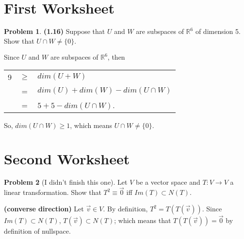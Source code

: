 \documentclass[11pt]{article}
\makeatletter
\renewenvironment{proof}{{\bfseries Proof}}{\qed}
\renewenvironment{proof}[1][\bfseries \proofname]{\par
  \pushQED{\qed}%
  \normalfont \topsep6\p@\@plus6\p@\relax
  \trivlist
  \item[\hskip\labelsep
        \scshape
    #1\@addpunct{}]\ignorespaces
}{%
  \popQED\endtrivlist\@endpefalse
}
\theoremstyle{definition}%
\newtheorem{problem}{Problem}[section]
\newcommand{\R}{\mathbb{R}}
\makeatother
\begin{document}
\section{First Worksheet}

\begin{problem}\textbf{(1.16)}
Suppose that $U$ and $W$ are subspaces of $\R^6$ of dimension 5. Show that $U \cap W \neq \{0\}.$

\begin{proof}
Since $U$ and $W$ are subspaces of $\R^6$, then 

\begin{tabular}{rcl}
9 	&$\geq$ 	& $dim(U + W)$ \\
	& =			& $dim(U) + dim(W) - dim(U \cap W)$ \\
	& = 		& $5 + 5 - dim(U \cap W)$. \\
\end{tabular}

\noindent So, $dim(U \cap W) \geq 1$, which means $U \cap W \neq \{0\}.$
\end{proof}
\end{problem}

\section{Second Worksheet}

\begin{problem}
[I didn't finish this one]
Let $V$ be a vector space and $T: V \to V$ a linear transformation. Show that $T^2 \equiv \vec{0}$ iff $Im(T) \subset N(T)$. 

\begin{proof}\textbf{(converse direction)}
Let $\vec{v} \in V$. By definition, $T^2 = T(T(\vec{v}))$. Since $Im(T) \subset N(T)$, $T(\vec{v}) \subset N(T)$; which means that $T(T(\vec{v})) = \vec{0}$ by definition of nullspace.
\end{proof}
\end{problem}
\end{document}
